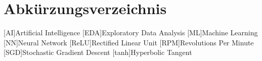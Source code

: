 \chapter*{Abkürzungsverzeichnis} 

\begin{acronym}
	
	[AI]{Artificial Intelligence}
	[EDA]{Exploratory Data Analysis}
	[ML]{Machine Learning}
	[NN]{Neural Network}
	[ReLU]{Rectified Linear Unit}
	[RPM]{Revolutions Per Minute}
	[SGD]{Stochastic Gradient Descent}
	[tanh]{Hyperbolic Tangent}
	
\end{acronym}
